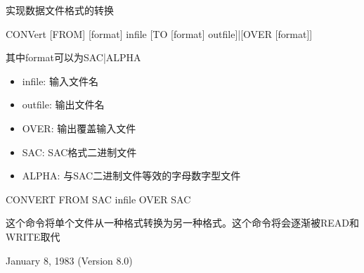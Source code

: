 \label{cmd:convert}

实现数据文件格式的转换

CONVert [FROM] [format] infile [TO [format] outfile]|[OVER [format]]

其中format可以为SAC|ALPHA

\begin{itemize}
\item infile: 输入文件名
\item outfile: 输出文件名
\item OVER: 输出覆盖输入文件
\item SAC: SAC格式二进制文件
\item ALPHA: 与SAC二进制文件等效的字母数字型文件
\end{itemize}

CONVERT FROM SAC infile OVER SAC

这个命令将单个文件从一种格式转换为另一种格式。这个命令将会逐渐被READ和WRITE取代

January 8, 1983 (Version 8.0)
